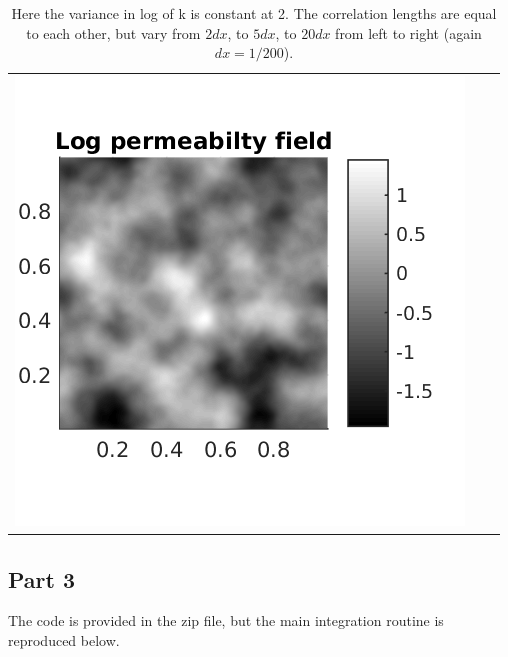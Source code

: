 \documentclass{article}
\begin{document}
\begin{table}[!h]
\begin{tabular}{c c c}
\includegraphics[scale=0.75]{figs/kfield_2_005_005.png}
\end{tabular}
\caption{Here the variance in log of k is constant at 2. The correlation lengths are equal to each other, but vary from $2dx$, to $5 dx$, to $20dx$ from left to right (again $dx = 1/200$).}
\end{table}

\subsection{Part 3}
The code is provided in the zip file, but the main integration routine is reproduced below.

\end{document}
